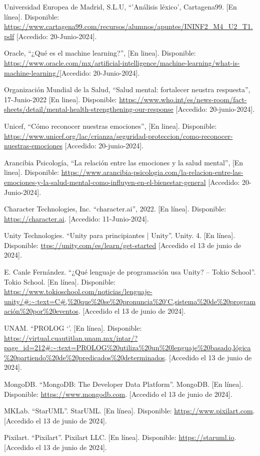 \documentclass[12pt,twoside]{article}
\begin{document}
\begin{thebibliography}{10}
	Universidad Europea de Madrid, S.L.U, ``'Análisis léxico', Cartagena99. [En línea]. Disponible: \url{https://www.cartagena99.com/recursos/alumnos/apuntes/ININF2_M4_U2_T1.pdf} [Accedido: 20-Junio-2024].
	
	Oracle, ``¿Qué es el machine learning?'', [En linea]. Disponible: \url{https://www.oracle.com/mx/artificial-intelligence/machine-learning/what-is-machine-learning/}[Accedido: 20-Junio-2024].
	
	Organización Mundial de la Salud, ``Salud mental: fortalecer neustra respuesta'', 17-Junio-2022 [En linea]. Disponible: \url{https://www.who.int/es/news-room/fact-sheets/detail/mental-health-strengthening-our-response} [Accedido: 20-junio-2024].
	
	Unicef, ``Cómo reconocer nuestras emociones'', [En linea]. Disponible: \url{https://www.unicef.org/lac/crianza/seguridad-proteccion/como-reconocer-nuestras-emociones} [Accedido: 20-junio-2024].
	
	Arancibia Psicología, ``La relación entre las emociones y la salud mental'', [En linea]. Disponible: \url{https://www.arancibia-psicologia.com/la-relacion-entre-las-emociones-y-la-salud-mental-como-influyen-en-el-bienestar-general} [Accedido: 20-Junio-2024].
	
	Character Technologies, Inc. ``character.ai'', 2022. [En línea]. Disponible: \url{https://character.ai}.  [Accedido: 11-Junio-2024].

	Unity Technologies. ``Unity para principiantes | Unity''. Unity. 4. [En línea]. Disponible: \url{ttps://unity.com/es/learn/get-started} [Accedido el 13 de junio de 2024].

	E. Canle Fernández. ``¿Qué lenguaje de programación usa Unity? – Tokio School”. Tokio School. [En línea]. Disponible: \url{https://www.tokioschool.com/noticias/lenguaje-unity/#:~:text=C#,%20que%20se%20pronuncia%20'C,sistema%20de%20programación%20por%20eventos}. [Accedido el 13 de junio de 2024].

 	UNAM. ``PROLOG `'. [En línea]. Disponible: \url{https://virtual.cuautitlan.unam.mx/intar/?page_id=212#:~:text=PROLOG%20utiliza%20un%20lenguaje%20basado,lógica%20partiendo%20de%20predicados%20determinados}. [Accedido el 13 de junio de 2024].

	MongoDB. ``MongoDB: The Developer Data Platform''. MongoDB.  [En línea]. Disponible: \url{https://www.mongodb.com}. [Accedido el 13 de junio de 2024].

	MKLab.  ``StarUML''. StarUML. [En línea]. Disponible: \url{https://www.pixilart.com}. [Accedido el 13 de junio de 2024].
	
	Pixilart.  ``Pixilart''. Pixilart LLC. [En línea]. Disponible: \url{https://staruml.io}. [Accedido el 13 de junio de 2024].

	\end{thebibliography}
	
\end{document}
